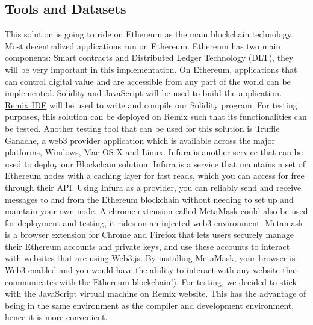 \documentclass{article}
\begin{document}
\begin{flushleft}
\subsection{Tools and Datasets}
This solution is going to ride on Ethereum as the main blockchain technology. Most decentralized applications run on Ethereum. Ethereum has two main components: Smart contracts and Distributed Ledger Technology (DLT), they will be very important in this implementation. On Ethereum, applications that can control digital value and are accessible from any part of the world can be implemented. Solidity and JavaScript will be used to build the application. \href{https://remix.ethereum.org/}{Remix IDE} will be used to write and compile our Solidity program. For testing purposes, this solution can be deployed on Remix such that its functionalities can be tested. Another testing tool that can be used for this solution is Truffle Ganache, a web3 provider application which is available across the major platforms, Windows, Mac OS X and Linux. Infura is another service that can be used to deploy our Blockchain solution. \cite{czombies} Infura is a service that maintains a set of Ethereum nodes with a caching layer for fast reads, which you can access for free through their API. Using Infura as a provider, you can reliably send and receive messages to and from the Ethereum blockchain without needing to set up and maintain your own node. A chrome extension called MetaMask could also be used for deployment and testing, it rides on an injected web3 environment.\cite{czombies} Metamask is a browser extension for Chrome and Firefox that lets users securely manage their Ethereum accounts and private keys, and use these accounts to interact with websites that are using Web3.js. By installing MetaMask, your browser is Web3 enabled and you would have the ability to interact with any website that communicates with the Ethereum blockchain!). For testing, we decided to stick with the JavaScript virtual machine on Remix website. This has the advantage of being in the same environment as the compiler and development environment, hence it is more convenient.


\end{flushleft}
\end{document}
